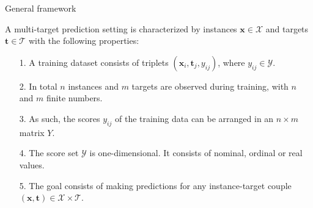 \documentclass[]{beamer}
\renewcommand{\vec}[1]{\boldsymbol{#1}}
\newcommand{\bx}{\boldsymbol{x}}
\newcommand{\by}{\boldsymbol{y}}
\newcommand{\bh}{\boldsymbol{h}}
\renewcommand{\emph}[1]{\textbf{\color{putblue}#1}}
\begin{document}
%

\begin{frame}{General framework}
\begin{definition}
A multi-target prediction setting is characterized by instances $\vec{x} \in \mathcal{X}$ and targets $\vec{t} \in \mathcal{T}$ with the following properties: 
\begin{itemize} 
\item[1.] A training dataset consists of triplets $(\vec{x}_i,\vec{t}_j,y_{ij})$, where $y_{ij} \in \mathcal{Y}$.  
\item[2.] In total $n$ instances and $m$ targets are observed during training, with $n$ and $m$ finite numbers. 
\item[3.]As such, the scores $y_{ij}$ of the training data can be arranged in an $n \times m$ matrix $Y$.
\item[4.] The score set $\mathcal{Y}$ is one-dimensional. It consists of nominal, ordinal or real values.  
\item[5.] The goal consists of making predictions for any instance-target couple $(\vec{x},\vec{t}) \in \mathcal{X} \times \mathcal{T}$.   
\end{itemize}
\end{definition}
\end{frame}
\end{document}
